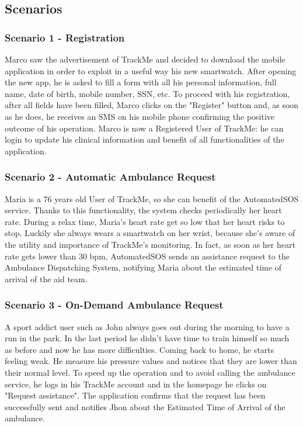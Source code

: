 \documentclass[12pt,a4paper]{article}
\begin{document}
	\newpage
	\subsection{Scenarios}
	\subsubsection*{Scenario 1 - Registration}
		Marco saw the advertisement of TrackMe and decided to download the mobile application in order to exploit in a useful way his new smartwatch. After opening the new app, he is asked to fill a form with all his personal information, full name, date of birth, mobile number, SSN, etc. To proceed with his registration, after all fields have been filled, Marco clicks on the "Register" button and, as soon as he does, he receives an SMS on his mobile phone confirming the positive outcome of his operation. Marco is now a Registered User of TrackMe: he can login to update his clinical information and benefit of all functionalities of the application.

	\subsubsection*{Scenario 2 - Automatic Ambulance Request}
		Maria is a 76 years old User of TrackMe, so she can benefit of the AutomatedSOS service. Thanks to this functionality, the system checks periodically her heart rate. During a relax time, Maria's heart rate get so low that her heart risks to stop. Luckily she always wears a smartwatch on her wrist, because she's aware of the utility and importance of TrackMe's monitoring. In fact, as soon as her heart rate gets lower than 30 bpm, AutomatedSOS sends an assistance request to the Ambulance Dispatching System, notifying Maria about the estimated time of arrival of the aid team.

	\subsubsection*{Scenario 3 - On-Demand Ambulance Request}
		A sport addict user such as John always goes out during the morning to have a run in the park.
		In the last period he didn't have time to train himself so much as before and now he has more difficulties. Coming back to home, he starts feeling weak. He measure his pressure values and notices that they are lower than their normal level. To speed up the operation and to avoid calling the ambulance service, he logs in his TrackMe account and in the homepage he clicks on "Request assistance". The application confirms that the request has been successfully sent and notifies Jhon about the Estimated Time of Arrival of the ambulance.
\end{document}

